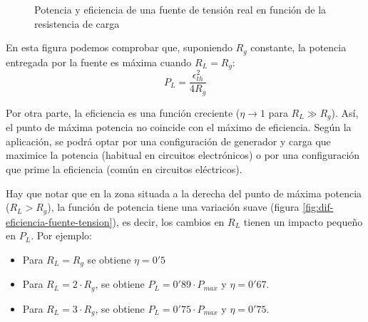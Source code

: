 \begin{figure}
  \centering
  \hspace{4cm}
  \caption{Potencia y eficiencia de una fuente de tensión real en función de la resistencia de carga}
\end{figure}

En esta figura podemos comprobar que, suponiendo \(R_g\) constante, la
potencia entregada por la fuente es máxima cuando \(R_L = R_g\):
\begin{equation*}
  P_L = \frac{\epsilon^2_{th}}{4 R_g}
\end{equation*}

Por otra parte, la eficiencia es una función creciente (\(\eta \to 1\)
para \(R_L \gg R_g\)). Así, el punto de máxima potencia no coincide
con el máximo de eficiencia. Según la aplicación, se podrá optar por
una configuración de generador y carga que maximice la potencia
(habitual en circuitos electrónicos) o por una configuración que prime
la eficiencia (común en circuitos eléctricos).

Hay que notar que en la zona situada a la derecha del punto de máxima
potencia (\(R_L > R_g\)), la función de potencia tiene una variación
suave (figura \ref{fig:dif-eficiencia-fuente-tension}), es decir, los
cambios en \(R_L\) tienen un impacto pequeño en \(P_L\).  Por ejemplo:
\begin{itemize}
\item Para \(R_L = R_g\) se obtiene \(\eta = 0'5\)
\item Para \(R_L = 2\cdot R_g\), se obtiene
  \(P_L = 0'89 \cdot P_{max}\) y \(\eta = 0'67\).
\item Para \(R_L = 3\cdot R_g\), se obtiene
  \(P_L = 0'75 \cdot P_{max}\) y \(\eta = 0'75\).
\end{itemize}


